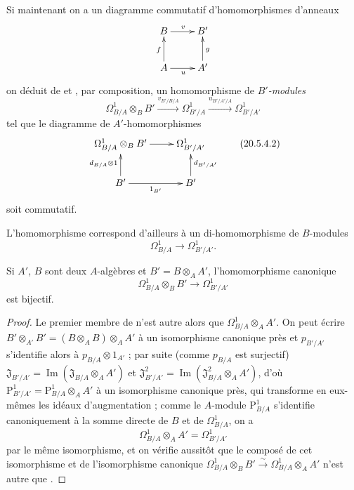 \begin{env}[20.5.4]
\label{0.20.5.4-fr}
Si maintenant on a un diagramme commutatif d'homomorphismes d'anneaux
\[
\xymatrix{
  B \ar[r]^v & B' \\
  A \ar[u]^f \ar[r]_u & A' \ar[u]_g
}
\]
on déduit de  et , par composition,
un homomorphisme de \emph{$B'$-modules}
\begin{equation}
\tag{20.5.4.1}
\label{0.20.5.4.1-fr}
  \Omega^1_{B/A}\otimes_B B'
  \xrightarrow{v_{B'/B/A}}\Omega^1_{B'/A}
  \xrightarrow{u_{B'/A'/A}}\Omega^1_{B'/A'}
\end{equation}
tel que le diagramme de $A'$-homomorphismes
\[
\xymatrix{
  \Omega^1_{B/A}\otimes_B B' \ar[r] & \Omega^1_{B'/A'} \\
  B' \ar[u]^{d_{B/A}\otimes1} \ar[r]_{1_{B'}} &
  B' \ar[u]_{d_{B'/A'}}
}
\tag{20.5.4.2}
\label{0.20.5.4.2-fr}
\]
soit commutatif.

L'homomorphisme  correspond d'ailleurs à un
di-homomorphisme de $B$-modules
\begin{equation}
\tag{20.5.4.3}
\label{0.20.5.4.3-fr}
  \Omega^1_{B/A}\to\Omega^1_{B'/A'}.
\end{equation}
\end{env}

\begin{proposition}[20.5.5]
\label{0.20.5.5-fr}
Si $A'$, $B$ sont deux $A$-algèbres et $B'=B\otimes_A A'$,
l'homomorphisme canonique \textup{}
\begin{equation}
\tag{20.5.5.1}
\label{0.20.5.5.1-fr}
  \Omega^1_{B/A}\otimes_B B'\to\Omega^1_{B'/A'}
\end{equation}
est bijectif.
\end{proposition}

\begin{proof}
Le premier membre de  n'est autre alors que
$\Omega^1_{B/A}\otimes_A A'$. On peut écrire
$B'\otimes_{A'}B'=(B\otimes_A B)\otimes_A A'$ à un isomorphisme canonique
près et $p_{B'/A'}$ s'identifie alors à
$p_{B/A}\otimes1_{A'}$ ; par suite (comme $p_{B/A}$ est surjectif)
$\mathfrak{J}_{B'/A'}=\operatorname{Im}(\mathfrak{J}_{B/A}\otimes_A A')$
et
$\mathfrak{J}^2_{B'/A'}
=\operatorname{Im}(\mathfrak{J}^2_{B/A}\otimes_A A')$, d'où
$\mathrm{P}^1_{B'/A'}=\mathrm{P}^1_{B/A}\otimes_A A'$ à un isomorphisme
canonique près, qui transforme en eux-mêmes les idéaux d'augmentation ;
comme le $A$-module $\mathrm{P}^1_{B/A}$ s'identifie canoniquement à la
somme directe de $B$ et de $\Omega^1_{B/A}$, on a
\begin{equation}
\tag{20.5.5.2}
\label{0.20.5.5.2-fr}
  \Omega^1_{B/A}\otimes_A A'=\Omega^1_{B'/A'}
\end{equation}
par le même isomorphisme, et on vérifie aussitôt que le composé de cet
isomorphisme et de l'isomorphisme canonique
$\Omega^1_{B/A}\otimes_B B'\xrightarrow{\sim}
\Omega^1_{B/A}\otimes_A A'$ n'est autre que .
\end{proof}

